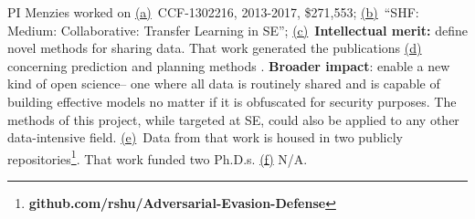 \documentclass[twoside]{NSF}
\begin{document}
\begin{nsfdescription}

PI Menzies worked on \underline{(a)}~CCF-1302216, 2013-2017, \$271,553; \underline{(b)}~``SHF: Medium: Collaborative: Transfer Learning in SE''; \underline{(c)}~{\bf Intellectual merit: }  
define novel methods for sharing data.  That work generated the publications  \underline{(d)}~\cite{peters2015lace2,he13,Me17,fu2016tuning,krishna2017learning,krishna2020whence} concerning prediction and planning methods \cite{krishnaTSE18}. %
 {\bf Broader impact}:
enable a new kind of open science-- one where all data is routinely shared and is capable of building effective models no matter if it is obfuscated for security purposes.
The methods of this project, while targeted at SE, could also be applied to any other data-intensive field. \underline{(e)}~Data from that work is   housed in   two
publicly   repositories\footnote{
{\bf github.com/rshu/Adversarial-Evasion-Defense}}. That work  funded two Ph.D.s. \underline{(f)}
N/A. 




\end{nsfdescription}
\end{document}
